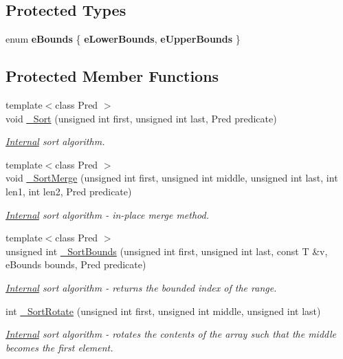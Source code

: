 \subsection*{Protected Types}
\begin{DoxyCompactItemize}
\item 
\hypertarget{class_c_p_v_r_t_array_a357bcaf83c2e62a7894e2d37b31055bf}{enum {\bfseries e\+Bounds} \{ {\bfseries e\+Lower\+Bounds}, 
{\bfseries e\+Upper\+Bounds}
 \}}\label{class_c_p_v_r_t_array_a357bcaf83c2e62a7894e2d37b31055bf}

\end{DoxyCompactItemize}
\subsection*{Protected Member Functions}
\begin{DoxyCompactItemize}
\item 
{\footnotesize template$<$class Pred $>$ }\\void \hyperlink{class_c_p_v_r_t_array_a1d314711ff51f9f49623d30b94a9be56}{\+\_\+\+Sort} (unsigned int first, unsigned int last, Pred predicate)
\begin{DoxyCompactList}\small\item\em \hyperlink{struct_internal}{Internal} sort algorithm. \end{DoxyCompactList}\item 
{\footnotesize template$<$class Pred $>$ }\\void \hyperlink{class_c_p_v_r_t_array_a948f329ea4ea544a65f4e2fac59bfef1}{\+\_\+\+Sort\+Merge} (unsigned int first, unsigned int middle, unsigned int last, int len1, int len2, Pred predicate)
\begin{DoxyCompactList}\small\item\em \hyperlink{struct_internal}{Internal} sort algorithm -\/ in-\/place merge method. \end{DoxyCompactList}\item 
{\footnotesize template$<$class Pred $>$ }\\unsigned int \hyperlink{class_c_p_v_r_t_array_a5705673b8ac77f9f762ce7db46fff5cd}{\+\_\+\+Sort\+Bounds} (unsigned int first, unsigned int last, const T \&v, e\+Bounds bounds, Pred predicate)
\begin{DoxyCompactList}\small\item\em \hyperlink{struct_internal}{Internal} sort algorithm -\/ returns the bounded index of the range. \end{DoxyCompactList}\item 
int \hyperlink{class_c_p_v_r_t_array_a912ef97c8e43ea5b24882b6f458fd873}{\+\_\+\+Sort\+Rotate} (unsigned int first, unsigned int middle, unsigned int last)
\begin{DoxyCompactList}\small\item\em \hyperlink{struct_internal}{Internal} sort algorithm -\/ rotates the contents of the array such that the middle becomes the first element. \end{DoxyCompactList}\end{DoxyCompactItemize}
